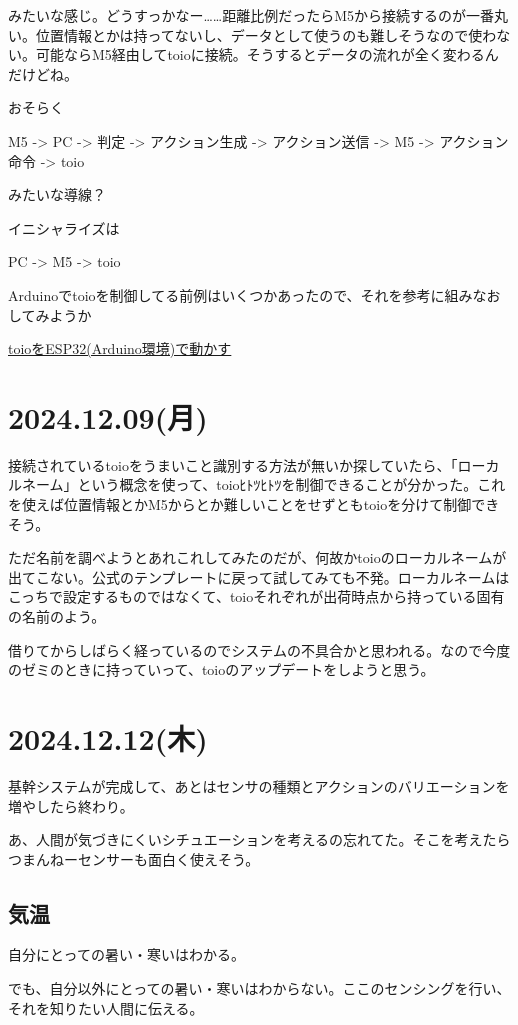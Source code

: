\documentclass[fleqn,twocolumn]{mynote}
\begin{document}
みたいな感じ。どうすっかなー……距離比例だったらM5から接続するのが一番丸い。位置情報とかは持ってないし、データとして使うのも難しそうなので使わない。可能ならM5経由してtoioに接続。そうするとデータの流れが全く変わるんだけどね。

おそらく

M5 -> PC -> 判定 -> アクション生成 -> アクション送信 -> M5 -> アクション命令 -> toio

みたいな導線？

イニシャライズは

PC -> M5 -> toio

Arduinoでtoioを制御してる前例はいくつかあったので、それを参考に組みなおしてみようか

\href{https://note.com/vhideo/n/nff5e2845beb1}{toioをESP32(Arduino環境)で動かす}

\section*{2024.12.09(月)}
接続されているtoioをうまいこと識別する方法が無いか探していたら、「ローカルネーム」という概念を使って、toioﾋﾄﾂﾋﾄﾂを制御できることが分かった。これを使えば位置情報とかM5からとか難しいことをせずともtoioを分けて制御できそう。

ただ名前を調べようとあれこれしてみたのだが、何故かtoioのローカルネームが出てこない。公式のテンプレートに戻って試してみても不発。ローカルネームはこっちで設定するものではなくて、toioそれぞれが出荷時点から持っている固有の名前のよう。

借りてからしばらく経っているのでシステムの不具合かと思われる。なので今度のゼミのときに持っていって、toioのアップデートをしようと思う。

\section*{2024.12.12(木)}
基幹システムが完成して、あとはセンサの種類とアクションのバリエーションを増やしたら終わり。

あ、人間が気づきにくいシチュエーションを考えるの忘れてた。そこを考えたらつまんねーセンサーも面白く使えそう。

\subsection*{気温}
自分にとっての暑い・寒いはわかる。

でも、自分以外にとっての暑い・寒いはわからない。ここのセンシングを行い、それを知りたい人間に伝える。
\end{document}
